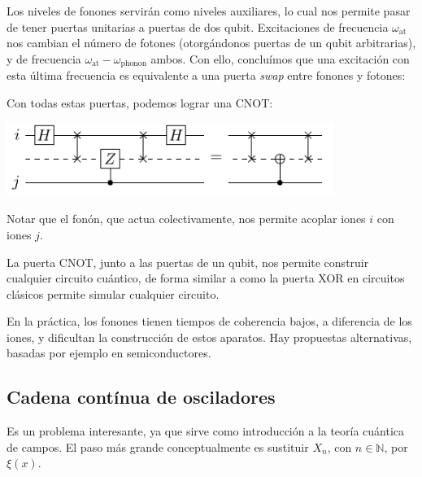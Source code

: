 \documentclass[a4paper,11pt]{tufte-book}
\begin{document}
Los niveles de fonones servirán como niveles auxiliares, lo cual nos
permite pasar de tener puertas unitarias a puertas de dos qubit.
Excitaciones de frecuencia $ω_\text{at}$ nos cambian el número de
fotones (otorgándonos puertas de un qubit arbitrarias), y de
frecuencia $ω_\text{at} -ω_\text{phonon}$ ambos. Con
ello, concluímos que una excitación con esta última frecuencia es
equivalente a una puerta \emph{swap} entre fonones y fotones:

\begin{center}
\end{center}

Con todas estas puertas, podemos lograr una CNOT:

\begin{center}
    \includegraphics[width=0.8\textwidth]{customcnot.pdf}
\end{center}

Notar que el fonón, que actua colectivamente, nos permite acoplar
iones $i$ con iones $j$.

La puerta CNOT, junto a las puertas de un qubit, nos permite construir
cualquier circuito cuántico, de forma similar a como la puerta XOR en
circuitos clásicos permite simular cualquier circuito.

En la práctica, los fonones tienen tiempos de coherencia bajos, a
diferencia de los iones, y dificultan la construcción de estos
aparatos. Hay propuestas alternativas, basadas por ejemplo en
semiconductores.

\subsection{Cadena contínua de osciladores}
Es un problema interesante, ya que sirve como introducción a la teoría
cuántica de campos. El paso más grande conceptualmente es sustituir
$X_n$, con $n\in \mathbb{N}$, por $ξ(x)$. %

\end{document}
